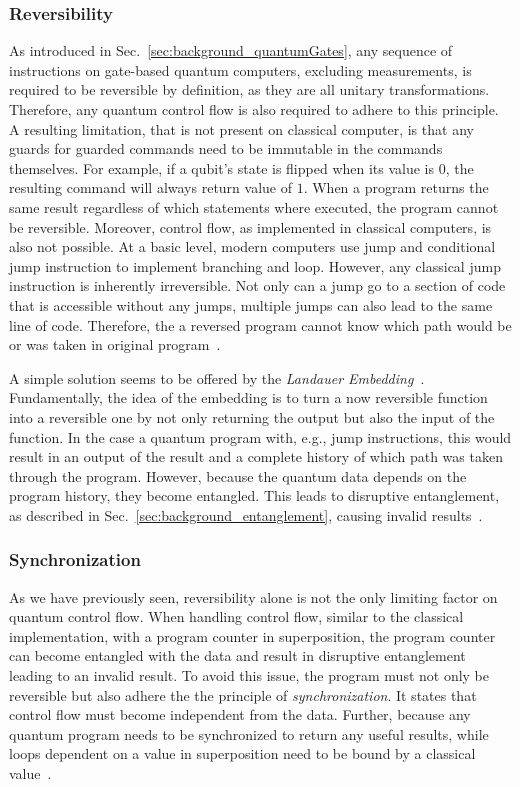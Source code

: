 \subsubsection{Reversibility}
\label{sec:background_controlflow_reversibility}
As introduced in Sec.~\ref{sec:background_quantumGates}, any sequence of instructions on gate-based quantum computers, excluding measurements, is required to be reversible by definition, as they are all unitary transformations. Therefore, any quantum control flow is also required to adhere to this principle. A resulting limitation, that is not present on classical computer, is that any guards for guarded commands need to be immutable in the commands themselves. For example, if a qubit's state is flipped when its value is $0$, the resulting command will always return value of $1$. When a program returns the same result regardless of which statements where executed, the program cannot be reversible.    
Moreover, control flow, as implemented in classical computers, is also not possible. At a basic level, modern computers use jump and conditional jump instruction to implement branching and loop. However, any classical jump instruction is inherently irreversible. Not only can a jump go to a section of code that is accessible without any jumps, multiple jumps can also lead to the same line of code. Therefore, the a reversed program cannot know which path would be or was taken in original program~\cite{YVC24}.  

A simple solution seems to be offered by the \emph{Landauer Embedding}~\cite{Land61}. Fundamentally, the idea of the embedding is to turn a now reversible function into a reversible one by not only returning the output but also the input of the function. In the case a quantum program with, e.g., jump instructions, this would result in an output of the result and a complete history of which path was taken through the program. However, because the quantum data depends on the program history, they become entangled. This leads to disruptive entanglement, as described in Sec.~\ref{sec:background_entanglement}, causing invalid results~\cite{YVC24}. 


\subsubsection{Synchronization}
\label{sec:background_controlflow_synchronization}
As we have previously seen, reversibility alone is not the only limiting factor on quantum control flow. When handling control flow, similar to the classical implementation, with a program counter in superposition, the program counter can become entangled with the data and result in disruptive entanglement leading to an invalid result. To avoid this issue, the program must not only be reversible but also adhere the the principle of \emph{synchronization}. It states that control flow must become independent from the data. Further, because any quantum program needs to be synchronized to return any useful results, while loops dependent on a value in superposition need to be bound by a classical value~\cite{YVC24}.  